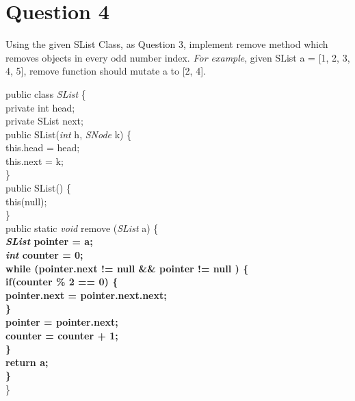 \documentclass[11 pt, oneside]{article}
\begin{document}
\section*{Question 4}
Using the given SList Class, as Question 3, implement remove method which removes objects in every odd number index. \textit{For example}, given SList a = [1, 2, 3, 4, 5], remove function should mutate a to [2, 4].
\begin{flushleft}
public class \textit{SList} \{\\
\setlength\parindent{12pt}
private int head;\\
private SList next;\\
\vspace{3mm}
public SList(\textit{int} h, \textit{SNode} k) \{\\
\setlength\parindent{24pt}
this.head = head;\\
this.next = k;\\
\setlength\parindent{12pt}
\}\\
\vspace{3mm}
public SList() \{\\
\setlength\parindent{24pt}
this(null); \\
\setlength\parindent{12pt}
\}\\
\vspace{3mm}
public static \textit{void} remove (\textit{SList} a) \{\\
\setlength\parindent{24pt}
\textbf{\textit{SList} pointer =  a;\\
\textit{int} counter = 0;\\
while (pointer.next != null \&\& pointer != null ) \{\\
\setlength\parindent{32pt}
if(counter \% 2 == 0) \{\\
\setlength\parindent{48pt}
pointer.next = pointer.next.next;\\
\setlength\parindent{32pt}
\}\\
pointer = pointer.next;\\
counter = counter + 1;\\
\setlength\parindent{24pt}
\}\\
return a;\\
\setlength\parindent{12pt}
\}\\
}
\setlength\parindent{0pt}
\}\\
\end{flushleft}
\clearpage
\end{document}

